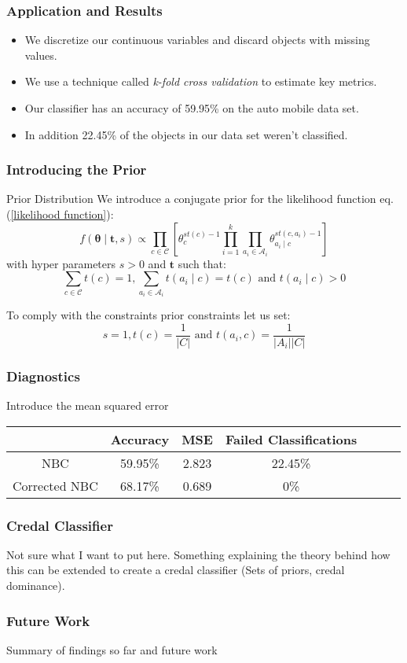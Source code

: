 \documentclass{beamer}
\begin{document}
\begin{frame}
	\frametitle{Application and Results}
	\begin{itemize}
		\item We discretize our continuous variables and discard objects with missing values.
		\item We use a technique called \textit{k-fold cross validation} to estimate key metrics.
		\item Our classifier has  an accuracy of 59.95\% on the auto mobile data set.
		\item In addition 22.45\% of the objects in our data set weren't classified.
	\end{itemize}
\end{frame}

\begin{frame}
	\frametitle{Introducing the Prior}
	\begin{block}{Prior Distribution}
		We introduce a conjugate prior for the likelihood function eq. (\ref{likelihood function}):
		\begin{equation}
			f(\mathbf{\theta} \mid \mathbf{t}, s) \propto \prod_{c \in \mathcal{C}} \left[ \theta_c^{st(c) - 1} \prod_{i=1}^k \prod_{a_i \in \mathcal{A}_i} \theta_{a_i \mid c}^{st(c, a_i) - 1} \right]
		\end{equation}
		with hyper parameters $s>0$ and $\mathbf{t}$ such that:
		\begin{equation}
			\sum_{c \in \mathcal{C}} t(c) = 1, \sum_{a_i \in \mathcal{A}_i} t(a_i \mid c) = t(c) \text{ and } t(a_i \mid c) > 0
		\end{equation}
	\end{block}
	To comply with the constraints prior constraints let us set:
	\begin{equation}
		s = 1, t(c) = \frac{1}{|C|} \text{ and } t(a_i, c) = \frac{1}{|A_i||C|}
	\end{equation}
\end{frame}

\begin{frame}
	\frametitle{Diagnostics}
	Introduce the mean squared error
	\begin{tabular}{ c|c c c c c c }
		              & Accuracy & MSE   & Failed Classifications \\
		\hline
		NBC           & 59.95\%  & 2.823 & 22.45\%                \\
		Corrected NBC & 68.17\%  & 0.689 & 0\%
	\end{tabular}
\end{frame}

\begin{frame}
	\frametitle{Credal Classifier}
	Not sure what I want to put here. Something explaining the theory behind how this can be extended to create a credal classifier (Sets of priors, credal dominance).
\end{frame}

\begin{frame}
	\frametitle{Future Work}
	Summary of findings so far and future work
\end{frame}
 
\end{document}
